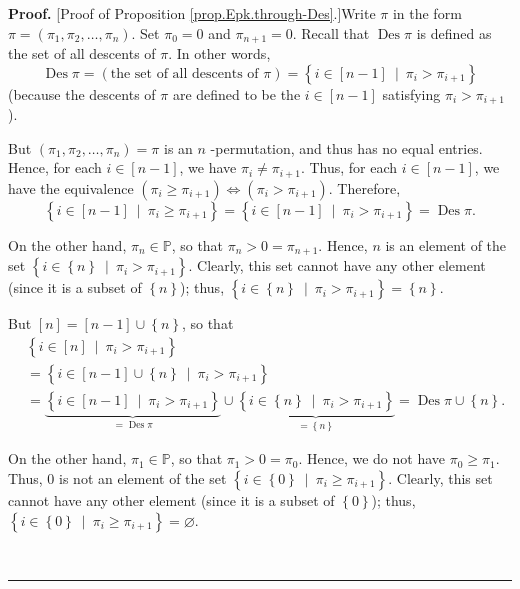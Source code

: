 \documentclass[numbers=enddot,12pt,final,onecolumn,notitlepage]{scrartcl}%
\theoremstyle{definition}
\newenvironment{proof}[1][Proof]{\noindent\textbf{#1.} }{\ \rule{0.5em}{0.5em}}
\newenvironment{verlong}{}{}
\begin{document}
\begin{verlong}
\begin{proof}
[Proof of Proposition \ref{prop.Epk.through-Des}.]Write $\pi$ in the form
$\pi=\left(  \pi_{1},\pi_{2},\ldots,\pi_{n}\right)  $. Set $\pi_{0}=0$ and
$\pi_{n+1}=0$. Recall that $\operatorname{Des}\pi$ is defined as the set of
all descents of $\pi$. In other words,%
\[
\operatorname{Des}\pi=\left(  \text{the set of all descents of }\pi\right)
=\left\{  i\in\left[  n-1\right]  \ \mid\ \pi_{i}>\pi_{i+1}\right\}
\]
(because the descents of $\pi$ are defined to be the $i\in\left[  n-1\right]
$ satisfying $\pi_{i}>\pi_{i+1}$).

But $\left(  \pi_{1},\pi_{2},\ldots,\pi_{n}\right)  =\pi$ is an $n$%
-permutation, and thus has no equal entries. Hence, for each $i\in\left[
n-1\right]  $, we have $\pi_{i}\neq\pi_{i+1}$. Thus, for each $i\in\left[
n-1\right]  $, we have the equivalence $\left(  \pi_{i}\geq\pi_{i+1}\right)
\Longleftrightarrow\left(  \pi_{i}>\pi_{i+1}\right)  $. Therefore,%
\[
\left\{  i\in\left[  n-1\right]  \ \mid\ \pi_{i}\geq\pi_{i+1}\right\}
=\left\{  i\in\left[  n-1\right]  \ \mid\ \pi_{i}>\pi_{i+1}\right\}
=\operatorname{Des}\pi.
\]


On the other hand, $\pi_{n}\in\mathbb{P}$, so that $\pi_{n}%
>0=\pi_{n+1}$. Hence, $n$ is an element of the set $\left\{  i\in\left\{
n\right\}  \ \mid\ \pi_{i}>\pi_{i+1}\right\}  $. Clearly, this set cannot have
any other element (since it is a subset of $\left\{  n\right\}  $); thus,
$\left\{  i\in\left\{  n\right\}  \ \mid\ \pi_{i}>\pi_{i+1}\right\}  =\left\{
n\right\}  $.

But $\left[  n\right]  =\left[  n-1\right]  \cup\left\{  n\right\}  $, so
that
\begin{align}
&  \left\{  i\in\left[  n\right]  \ \mid\ \pi_{i}>\pi_{i+1}\right\}
\nonumber\\
&  =\left\{  i\in\left[  n-1\right]  \cup\left\{  n\right\}  \ \mid\ \pi
_{i}>\pi_{i+1}\right\} \nonumber\\
&  =\underbrace{\left\{  i\in\left[  n-1\right]  \ \mid\ \pi_{i}>\pi
_{i+1}\right\}  }_{=\operatorname{Des}\pi}\cup\underbrace{\left\{
i\in\left\{  n\right\}  \ \mid\ \pi_{i}>\pi_{i+1}\right\}  }_{=\left\{
n\right\}  }=\operatorname{Des}\pi\cup\left\{  n\right\}  .
\label{pf.prop.Epk.through-Des.Desun}%
\end{align}


On the other hand, $\pi_{1}\in\mathbb{P}$, so that $\pi_{1}>0=\pi_{0}%
$. Hence, we do not have $\pi_{0}\geq\pi_{1}$. Thus, $0$ is not an element of
the set $\left\{  i\in\left\{  0\right\}  \ \mid\ \pi_{i}\geq\pi
_{i+1}\right\}  $. Clearly, this set cannot have any other element (since it
is a subset of $\left\{  0\right\}  $); thus,
$\left\{  i\in\left\{  0\right\} \ \mid\ \pi_{i}\geq\pi_{i+1}\right\}
=\varnothing$.


\end{proof}
\end{verlong}
\end{document}
